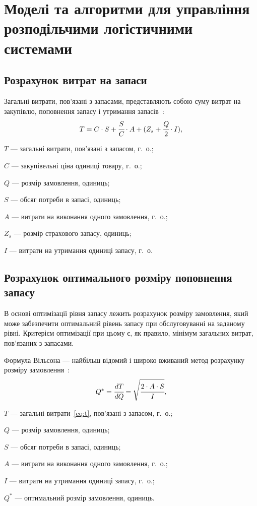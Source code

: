 \section{Моделі та алгоритми для управління розподільчими логістичними системами}
\subsection{Розрахунок витрат на запаси}
Загальні витрати, пов'язані з запасами, представляють собою суму витрат на закупівлю, поповнення запасу і утримання запасів~\cite{Sterligova2008}:
\begin{equation} \label{eq:t}
T=C\cdot S+\cfrac{S}{C}\cdot A+(Z_s+\cfrac{Q}{2}\cdot I)
,
\end{equation}
\begin{description}
	\item[де] $T$ --- загальні витрати, пов'язані з запасом, г.~о.;
	\item $C$ --- закупівельні ціна одиниці товару, г.~о.;
	\item $Q$ --- розмір замовлення, одиниць;
	\item $S$ --- обсяг потреби в запасі, одиниць;
	\item $A$ --- витрати на виконання одного замовлення, г.~о.;
	\item $Z_s$ --- розмір страхового запасу, одиниць;
	\item $I$ --- витрати на утримання одиниці запасу, г.~о.
\end{description}

\subsection{Розрахунок оптимального розміру поповнення запасу}
В основі оптимізації рівня запасу лежить розрахунок розміру замовлення, який може забезпечити оптимальний рівень запасу при обслуговуванні на заданому рівні.
Критерієм оптимізації при цьому є, як правило, мінімум загальних витрат, пов'язаних з запасами.

Формула Вільсона --- найбільш відомий і широко вживаний метод розрахунку розміру замовлення~\cite{Sterligova2008}:
\begin{equation}
Q^*=\cfrac{dT}{dQ}=\sqrt{\cfrac{2\cdot A\cdot S}{I}}
,
\end{equation}
\begin{description}
	\item[де] $T$ --- загальні витрати~\eqref{eq:t}, пов'язані з запасом, г.~о.;
	\item $Q$ --- розмір замовлення, одиниць;
	\item $S$ --- обсяг потреби в запасі, одиниць;
	\item $A$ --- витрати на виконання одного замовлення, г.~о.;
	\item $I$ --- витрати на утримання одиниці запасу, г.~о.;
	\item $Q^*$ --- оптимальний розмір замовлення, одиниць.
\end{description}

